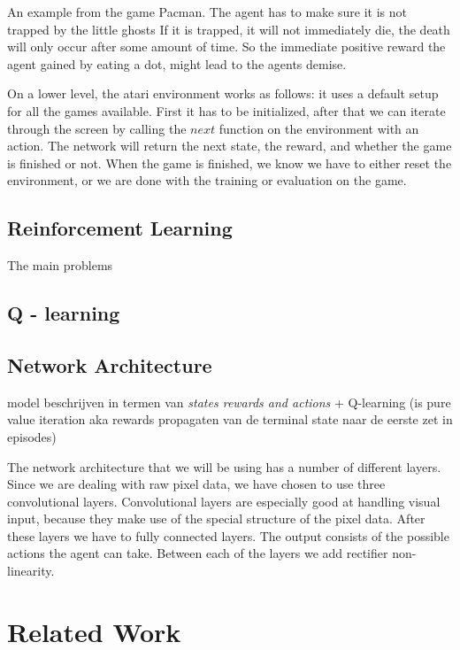 \documentclass{article}
\begin{document}
An example from the game Pacman. The agent has to make sure it is not trapped by the little ghosts If it is trapped, it will not immediately die, the death will only occur after some amount of time. So the immediate positive reward the agent gained by eating a dot, might lead to the agents demise.

On a lower level, the atari environment works as follows: it uses a default setup for all the games available. First it has to be initialized, after that we can iterate through the screen by calling the $next$ function on the environment with an action. The network will return the next state, the reward, and whether the game is finished or not. When the game is finished, we know we have to either reset the environment, or we are done with the training or evaluation on the game.

\subsection{Reinforcement Learning}

The main problems 

\subsection{Q - learning}



\subsection{Network Architecture}

model beschrijven in termen van \emph{states rewards and actions} + Q-learning (is pure value iteration aka rewards propagaten van de terminal state naar de eerste zet in episodes)

The network architecture that we will be using has a number of different layers. Since we are dealing with raw pixel data, we have chosen to use three %
convolutional layers. Convolutional layers are especially good at handling visual input, because they make use of the special structure of the pixel data. After these layers we have to fully connected layers. The output consists of the possible actions the agent can take. Between each of the layers we add rectifier non-linearity.




\section{Related Work}
\end{document}
